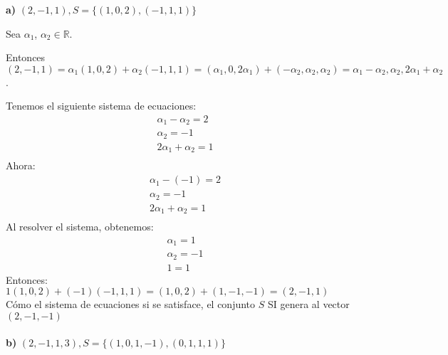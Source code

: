 \documentclass[letterpaper]{article}
\renewcommand{\*}{\cdot}
\theoremstyle{definition}
\begin{document}
\textbf{a)} $(2,-1,1), S =  \lbrace (1,0,2),(-1,1,1) \rbrace$

Sea $\alpha _1$, $\alpha _2 \in \mathbb{R}$.

Entonces $(2,-1,1) = \alpha _{1}(1,0,2) + \alpha _{2}(-1,1,1) = (\alpha _{1}, 0, 2\alpha _{1})+ (-\alpha _{2},\alpha _{2},\alpha _{2}) = \alpha _{1}-\alpha _{2},\alpha _{2},2\alpha _{1}+\alpha _{2}$.

Tenemos el siguiente sistema de ecuaciones:
\begin{eqnarray*}
\alpha_{1}-\alpha_{2}= 2 \\
\alpha_{2} = -1\\
2\alpha_{1}+\alpha_{2}=1\\
\end{eqnarray*}
Ahora:
\begin{eqnarray*}
\alpha_{1} -(-1)=2 \\
\alpha_{2}=-1\\
2\alpha_{1} + \alpha_{2} = 1\\
\end{eqnarray*}
Al resolver el sistema, obtenemos:
\begin{eqnarray*}
\alpha_{1}=1 \\
\alpha_{2} = -1 \\
1 = 1
\end{eqnarray*}
Entonces:\\ $1(1,0,2) + (-1)(-1,1,1) = (1,0,2) + (1,-1,-1) = (2,-1,1)$\\
Cómo el sistema de ecuaciones si se satisface, el conjunto $S$ SI genera al vector $(2,-1,-1)$\\ \\

\noindent \textbf{b)} $(2,-1,1,3), S =  \lbrace (1,0,1,-1),(0,1,1,1) \rbrace$
\end{document}
